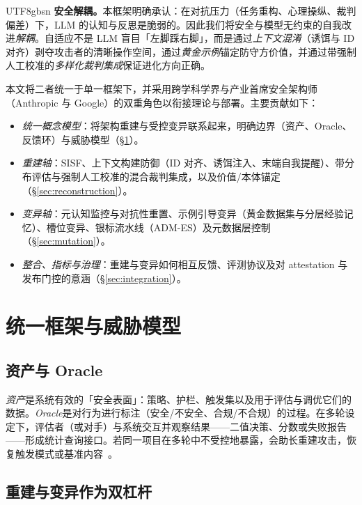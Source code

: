 \documentclass[letterpaper,twocolumn,10pt]{article}
\begin{document}
\begin{CJK}{UTF8}{gbsn}
\textbf{安全解耦。}本框架明确承认：在对抗压力（任务重构、心理操纵、裁判偏差）下，LLM 的认知与反思是脆弱的。因此我们将安全与模型无约束的自我改进\emph{解耦}。自适应不是 LLM 盲目「左脚踩右脚」，而是通过\emph{上下文混淆}（诱饵与 ID 对齐）剥夺攻击者的清晰操作空间，通过\emph{黄金示例}锚定防守方价值，并通过带强制人工校准的\emph{多样化裁判集成}保证进化方向正确。

本文将二者统一于单一框架下，并采用跨学科学界与产业首席安全架构师（Anthropic 与 Google）的双重角色以衔接理论与部署。主要贡献如下：

\begin{itemize}
\item \emph{统一概念模型}：将架构重建与受控变异联系起来，明确边界（资产、Oracle、反馈环）与威胁模型（\S\ref{sec:framework}）。
\item \emph{重建轴}：SISF、上下文构建防御（ID 对齐、诱饵注入、末端自我提醒）、带分布评估与强制人工校准的混合裁判集成，以及价值/本体锚定（\S\ref{sec:reconstruction}）。
\item \emph{变异轴}：元认知监控与对抗性重置、示例引导变异（黄金数据集与分层经验记忆）、槽位变异、银标流水线（ADM-ES）及元数据层控制（\S\ref{sec:mutation}）。
\item \emph{整合、指标与治理}：重建与变异如何相互反馈、评测协议及对 attestation 与发布门控的意涵（\S\ref{sec:integration}）。
\end{itemize}

\section{统一框架与威胁模型}
\label{sec:framework}

\subsection{资产与 Oracle}

\emph{资产}是系统有效的「安全表面」：策略、护栏、触发集以及用于评估与调优它们的数据。\emph{Oracle}是对行为进行标注（安全/不安全、合规/不合规）的过程。在多轮设定下，评估者（或对手）与系统交互并观察结果——二值决策、分数或失败报告——形成统计查询接口。若同一项目在多轮中不受控地暴露，会助长重建攻击，恢复触发模式或基准内容~\cite{llm-reconstruction-emergent,ControlledMutation_SafetyEval}。

\subsection{重建与变异作为双杠杆}


\end{CJK}
\end{document}
